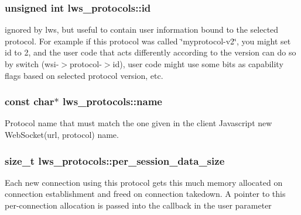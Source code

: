 \subsubsection[{\texorpdfstring{id}{id}}]{\setlength{\rightskip}{0pt plus 5cm}unsigned int lws\+\_\+protocols\+::id}\hypertarget{structlws__protocols_a6b632018590c2b1bbe43fbab6d5e6fac}{}\label{structlws__protocols_a6b632018590c2b1bbe43fbab6d5e6fac}
ignored by lws, but useful to contain user information bound to the selected protocol. For example if this protocol was called \char`\"{}myprotocol-\/v2\char`\"{}, you might set id to 2, and the user code that acts differently according to the version can do so by switch (wsi-\/$>$protocol-\/$>$id), user code might use some bits as capability flags based on selected protocol version, etc. 
\subsubsection[{\texorpdfstring{name}{name}}]{\setlength{\rightskip}{0pt plus 5cm}const char$\ast$ lws\+\_\+protocols\+::name}\hypertarget{structlws__protocols_a0e63edb457a613c3fa4271e0a8f19624}{}\label{structlws__protocols_a0e63edb457a613c3fa4271e0a8f19624}
Protocol name that must match the one given in the client Javascript new Web\+Socket(url, \textquotesingle{}protocol\textquotesingle{}) name. 
\subsubsection[{\texorpdfstring{per\+\_\+session\+\_\+data\+\_\+size}{per\_session\_data\_size}}]{\setlength{\rightskip}{0pt plus 5cm}size\+\_\+t lws\+\_\+protocols\+::per\+\_\+session\+\_\+data\+\_\+size}\hypertarget{structlws__protocols_a9bbd85f591ffb4259711cb5acbb05bea}{}\label{structlws__protocols_a9bbd85f591ffb4259711cb5acbb05bea}
Each new connection using this protocol gets this much memory allocated on connection establishment and freed on connection takedown. A pointer to this per-\/connection allocation is passed into the callback in the \textquotesingle{}user\textquotesingle{} parameter 
